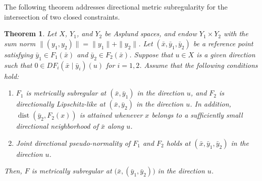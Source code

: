 \documentclass[12pt,twoside,reqno]{amsart}
\newtheorem{theorem}{Theorem}[section]
\theoremstyle{definition}
\numberwithin{equation}{section}
\begin{document}
The following theorem addresses directional metric subregularity for the intersection of two closed constraints. 

\begin{theorem}\label{thm:directional_mscq_intersection}
Let $X$, $Y_1$, and $Y_2$ be Asplund spaces, and endow $Y_1\times Y_2$ with the sum norm $\|(y_1,y_2)\|=\|y_1\|+\|y_2\|$. 
Let $(\bar{x}, \bar{y}_1, \bar{y}_2)$ be a reference point satisfying $\bar{y}_1 \in F_1(\bar{x})$ and $\bar{y}_2 \in F_2(\bar{x})$. Suppose that $u \in X$ is a given direction such that \(0\in DF_i(\bar{x}\mid \bar{y}_i)(u)\) for $i=1,2$. Assume that the following conditions hold:

\begin{enumerate}
\item[(i)] $F_1$ is metrically subregular at $(\bar{x},\bar{y}_1)$ in the direction $u$, and $F_2$ is directionally Lipschitz-like at $(\bar{x}, \bar{y}_2)$ in the direction $u$. In addition, $\operatorname{dist}(\bar{y}_2,F_2(x))$ is attained whenever $x$ belongs to a sufficiently small directional neighborhood of $\bar{x}$ along $u$.

\item[(ii)] Joint directional pseudo-normality of $F_1$ and $F_2$ holds at $(\bar{x},\bar{y}_1,\bar{y}_2)$ in the direction $u$.
\end{enumerate}

Then, $F$ is metrically subregular at $\big(\bar{x}, (\bar{y}_1, \bar{y}_2)\big)$ in the direction $u$. 
\end{theorem}
\end{document}
